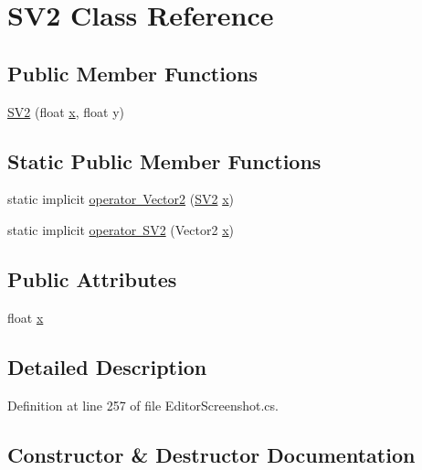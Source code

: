 \hypertarget{class_s_v2}{}\section{S\+V2 Class Reference}
\label{class_s_v2}
\subsection*{Public Member Functions}
\begin{DoxyCompactItemize}
\item 
\mbox{\hyperlink{class_s_v2_a00c93629ab59499109537780afc3ce7a}{S\+V2}} (float \mbox{\hyperlink{class_s_v2_a9572dba95fd80c7f00d13af7a51d2299}{x}}, float y)
\end{DoxyCompactItemize}
\subsection*{Static Public Member Functions}
\begin{DoxyCompactItemize}
\item 
static implicit \mbox{\hyperlink{class_s_v2_aad8a33ee4a29ca9c785d8350f2d029c0}{operator Vector2}} (\mbox{\hyperlink{class_s_v2}{S\+V2}} \mbox{\hyperlink{class_s_v2_a9572dba95fd80c7f00d13af7a51d2299}{x}})
\item 
static implicit \mbox{\hyperlink{class_s_v2_a73bb2ce3ab942d0fe69a10ceb75a27ba}{operator S\+V2}} (Vector2 \mbox{\hyperlink{class_s_v2_a9572dba95fd80c7f00d13af7a51d2299}{x}})
\end{DoxyCompactItemize}
\subsection*{Public Attributes}
\begin{DoxyCompactItemize}
\item 
float \mbox{\hyperlink{class_s_v2_a9572dba95fd80c7f00d13af7a51d2299}{x}}
\end{DoxyCompactItemize}


\subsection{Detailed Description}


Definition at line 257 of file Editor\+Screenshot.\+cs.



\subsection{Constructor \& Destructor Documentation}
\mbox{\label{class_s_v2_a00c93629ab59499109537780afc3ce7a}} 
